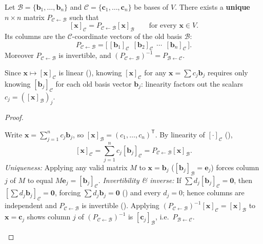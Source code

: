 \documentclass[10pt]{scrartcl}
\newcommand{\vv}[1]{\mathbf{#1}}
\begin{document}
\begin{theorem*}
  Let $\mathcal B=\{\vv b_1,\dots,\vv b_n\}$ and $\mathcal C=\{\vv c_1,\dots,\vv c_n\}$ be bases of $V$. There exists a \textbf{unique} $n\times n$ matrix $P_{\mathcal C\leftarrow\mathcal B}$ such that
  \[
    [\vv x]_{\mathcal C} = P_{\mathcal C\leftarrow\mathcal B}[\vv x]_{\mathcal B} \qquad \text{for every }\vv x\in V.
  \]
  Its columns are the $\mathcal C$-coordinate vectors of the old basis $\mathcal B$:
  \[
    P_{\mathcal C\leftarrow\mathcal B} = \bigl[\,[\vv b_1]_{\mathcal C}\ \ [\vv b_2]_{\mathcal C}\ \ \cdots\ \ [\vv b_n]_{\mathcal C}\,\bigr].
  \]
  Moreover $P_{\mathcal C\leftarrow\mathcal B}$ is invertible, and $(P_{\mathcal C\leftarrow\mathcal B})^{-1} = P_{\mathcal B\leftarrow\mathcal C}$.
\end{theorem*}
\begin{ideabox}
  Since $\vv x\mapsto[\vv x]_{\mathcal C}$ is linear (), knowing $[\vv x]_{\mathcal C}$ for any $\vv x=\sum c_j\vv b_j$ requires only knowing $[\vv b_j]_{\mathcal C}$ for each old basis vector $\vv b_j$: linearity factors out the scalars $c_j=([\vv x]_{\mathcal B})_j$.
\end{ideabox}
\begin{proof}
  \begin{steps}
    \ii Write $\vv x=\sum_{j=1}^n c_j\vv b_j$, so $[\vv x]_{\mathcal B}=(c_1,\dots,c_n)^{\mathsf T}$. By linearity of $[\cdot]_{\mathcal C}$ (),
    \[
      [\vv x]_{\mathcal C} = \sum_{j=1}^n c_j[\vv b_j]_{\mathcal C} = P_{\mathcal C\leftarrow\mathcal B}[\vv x]_{\mathcal B}.
    \]
    \ii \emph{Uniqueness:} Applying any valid matrix $M$ to $\vv x=\vv b_j$ ($[\vv b_j]_{\mathcal B}=\vv e_j$) forces column $j$ of $M$ to equal $M\vv e_j = [\vv b_j]_{\mathcal C}$.
    \ii \emph{Invertibility \& inverse:} If $\sum d_j[\vv b_j]_{\mathcal C}=\vv 0$, then $[\sum d_j\vv b_j]_{\mathcal C}=\vv 0$, forcing $\sum d_j\vv b_j=\vv 0$ () and every $d_j=0$; hence columns are independent and $P_{\mathcal C\leftarrow\mathcal B}$ is invertible (). Applying $(P_{\mathcal C\leftarrow\mathcal B})^{-1}[\vv x]_{\mathcal C}=[\vv x]_{\mathcal B}$ to $\vv x=\vv c_j$ shows column $j$ of $(P_{\mathcal C\leftarrow\mathcal B})^{-1}$ is $[\vv c_j]_{\mathcal B}$, i.e.\ $P_{\mathcal B\leftarrow\mathcal C}$.
  \end{steps}
\end{proof}
\end{document}
